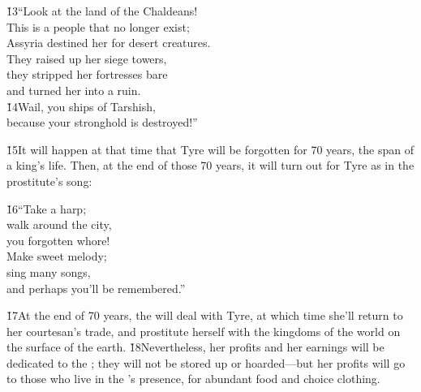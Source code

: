 \begin{poetry}
\poeml \v{13}``Look at the land of the Chaldeans! \\
\poemll    This is a people that no longer exist; \\
\poeml Assyria destined her for desert creatures. \\
\poemll    They raised up her siege towers, \\
\poeml they stripped her fortresses bare \\
\poemll    and turned her into a ruin. \\
\poeml \v{14}Wail, you ships of Tarshish, \\
\poemll    because your stronghold is destroyed!''
\end{poetry}

\v{15}It will happen at that time that Tyre will be forgotten for 70 years, the span of a king's life. Then, at the end of those 70 years, it will turn out for Tyre as in the prostitute's song:

\begin{poetry}
\poeml \v{16}``Take a harp; \\
\poemll    walk around the city, \\
\poemlll       you forgotten whore! \\
\poeml Make sweet melody; \\
\poemll    sing many songs, \\
\poemlll       and perhaps you'll be remembered.''
\end{poetry}

\v{17}At the end of 70 years, the  will deal with Tyre, at which time she'll return to her courtesan's trade, and prostitute herself with the kingdoms of the world on the surface of the earth. \v{18}Nevertheless, her profits and her earnings will be dedicated to the ; they will not be stored up or hoarded---but her profits will go to those who live in the 's presence, for abundant food and choice clothing.

